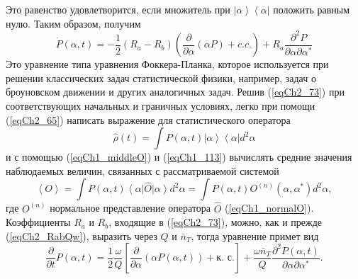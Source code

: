 Это равенство удовлетворится, если множитель при  
$\left|\alpha\right>\left<\alpha\right|$  положить равным 
нулю. Таким образом, получим 
\begin{equation}
\dot{P}\left(\alpha, t\right) = 
-\frac{1}{2}\left(R_a - R_b\right)
\left(
\frac{\partial}{\partial \alpha}\left(\alpha P\right) + c.c.
\right)
+ R_a
\frac{\partial^2 P}{\partial \alpha \partial \alpha^{*}}
\label{eqCh2_73}
\end{equation}
Это уравнение типа уравнения Фоккера-Планка, которое используется при
решении классических задач статистической физики, например, задач о
броуновском движении и других аналогичных задач. Решив
(\ref{eqCh2_73}) при соответствующих начальных и граничных условиях,
легко при помощи (\ref{eqCh2_65}) написать выражение для
статистического оператора 
\[
\hat{\rho}\left(t\right) = 
\int P\left(\alpha, t\right)
\left|\alpha\right>\left<\alpha\right| 
d^2 \alpha
\]
и с помощью (\ref{eqCh1_middleO}) и (\ref{eqCh1_113}) вычислять
средние значения наблюдаемых величин, связанных с рассматриваемой
системой   
\[
\left<O\right>= \int P\left(\alpha, t\right) \left<\alpha\right|\hat{O}\left|\alpha\right>d^2
\alpha =
\int  P\left(\alpha, t\right)O^{\left(n\right)}\left(\alpha, \alpha^{*}\right)d^2\alpha,
\]
где $O^{\left(n\right)}$ нормальное представление оператора $\hat{O}$ (\ref{eqCh1_normalO}).
Коэффициенты  $R_a$ и  $R_b$,  входящие в (\ref{eqCh2_73}), можно, как
и прежде (\ref{eqCh2_RabQw}), выразить через  $Q$  и $\bar{n}_T$,
тогда уравнение примет вид 
\begin{equation}
\frac{\partial}{\partial t}P\left(\alpha, t\right) = 
\frac{1}{2}\frac{\omega}{Q}\left[
\frac{\partial}{\partial \alpha}\left(
\alpha P\left(\alpha, t\right)
\right) + \mbox{к. с.}
\right]
+
\frac{\omega \bar{n}_T}{Q} \frac{\partial^2  P\left(\alpha,
  t\right)}{\partial \alpha \partial \alpha^{*}}.
\label{eqCh2_74}
\end{equation}

